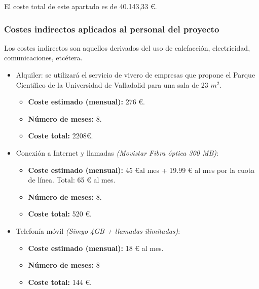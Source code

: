 \documentclass[twoside]{report}
\begin{document}
El coste total de este apartado es de 40.143,33 \euro.

\subsubsection{Costes indirectos aplicados al personal del proyecto}

Los costes indirectos son aquellos derivados del uso de calefacción, electricidad, comunicaciones, etcétera.

\begin{itemize}

\item Alquiler: se utilizará el servicio de vivero de empresas que propone el \cite{pcuva} Parque Científico de la Universidad de Valladolid para una sala de 23 ${m}^{2}$.
	\begin{itemize}
		\item \textbf{Coste estimado (mensual): } 276 \euro.
		\item \textbf{Número de meses:} 8.
		\item \textbf{Coste total:} 2208\euro.
	\end{itemize}
	
\item Conexión a Internet y llamadas \textit{(Movistar Fibra óptica 300 MB)}:
	\begin{itemize}
		\item \textbf{Coste estimado (mensual):} 45 \euro \hspace{0.1cm}al mes + 19.99 \euro \hspace{0.1cm} al mes por la cuota de línea. Total: 65 \euro \hspace{0.1cm} al mes.
		\item \textbf{Número de meses:} 8.
		\item \textbf{Coste total:} 520 \euro.
	\end{itemize}
		
\item Telefonía móvil \textit{(Simyo 4GB + llamadas ilimitadas)}:
	\begin{itemize}
		\item \textbf{Coste estimado (mensual):} 18 \euro \hspace{0.1cm} al mes.
		\item \textbf{Número de meses:} 8
		\item \textbf{Coste total:} 144 \euro.
	\end{itemize}

\end{itemize}
\end{document}
